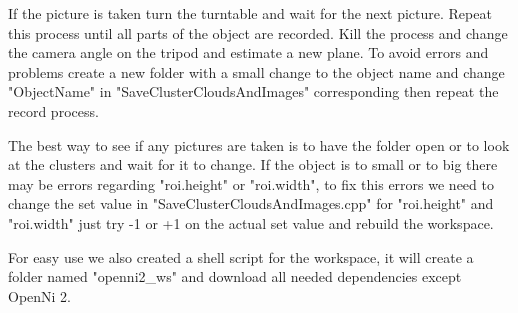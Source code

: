 \documentclass[main.tex]{subfiles}
\begin{document}
		If the picture is taken turn the turntable and wait for the next picture.
		Repeat this process until all parts of the object are recorded.
		Kill the process and change the camera angle on the tripod and estimate a new plane.
		To avoid errors and problems create a new folder with a small change to the object name
		and change "ObjectName" in "SaveClusterCloudsAndImages" corresponding then repeat the record process.

		The best way to see if any pictures are taken is to have the folder open or to look at the clusters and wait for it to change.
		If the object is to small or to big there may be errors regarding "roi.height" or "roi.width",
		to fix this errors we need to change the set value in "SaveClusterCloudsAndImages.cpp"
		for "roi.height" and "roi.width" just try -1 or +1 on the actual set value and rebuild the workspace.

		For easy use we also created a shell script for the workspace, it will create a folder named "openni2\_ws"
		and download all needed dependencies except OpenNi 2.
\end{document}
